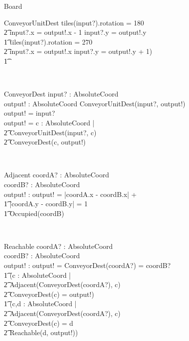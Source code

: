 \begin{class}{Board}
\begin{schema}{ConveyorUnitDest}
        tiles(input?).rotation = 180 \Rightarrow \\ \t2 input?.x = output!.x - 1 \wedge input?.y = output!.y \\ \t1
        tiles(input?).rotation = 270 \Rightarrow \\ \t2 input?.x = output!.x \wedge input?.y = output!.y + 1) \\ \t1
\end{schema} \\
\znewpage
\begin{schema}{ConveyorDest}
input? : AbsoluteCoord \\
output! : AbsoluteCoord
\where
\IF ConveyorUnitDest(input?, output!) \\
\THEN output! = input? \\
\ELSE output! = \exists c : AbsoluteCoord | \\ \t2 ConveyorUnitDest(input?, c) \\ \t2 ConveyorDest(c, output!)
\end{schema} \\
\begin{schema}{Adjacent}
coordA? : AbsoluteCoord \\
coordB? : AbsoluteCoord \\
output! : \bool
\where
output! = |\!coordA.x - coordB.x\!| + \\ \t1 |\!coordA.y - coordB.y\!| = 1 \\ \t1
\neg Occupied(coordB)
\end{schema} \\
\begin{schema}{Reachable}
coordA? : AbsoluteCoord \\
coordB? : AbsoluteCoord \\
output! : \bool
\where
output! = ConveyorDest(coordA?) = coordB? \: \vee \\ \t1 (\exists c : AbsoluteCoord | \\ \t2 Adjacent(ConveyorDest(coordA?), c) \: \wedge \\ \t2 ConveyorDest(c) = output!) \: \vee \\ \t1
(\exists c,d : AbsoluteCoord | \\ \t2 Adjacent(ConveyorDest(coordA?), c) \: \wedge \\ \t2 ConveyorDest(c) = d \: \wedge \\ \t2 Reachable(d, output!))
\end{schema} \\
\znewpage
\begin{classcom}

\end{classcom}
\end{class}
